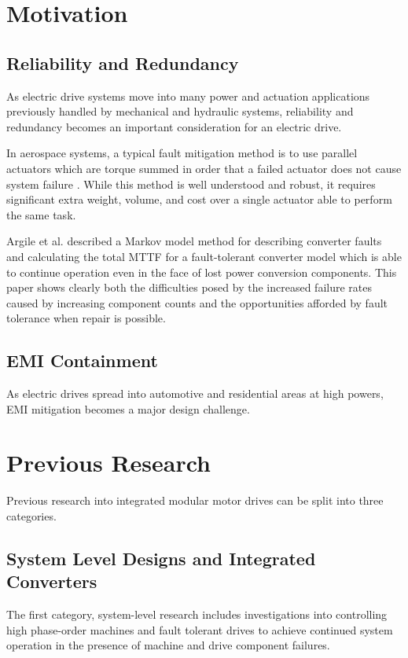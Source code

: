 \section{Motivation}



\subsection{Reliability and Redundancy}
As electric drive systems move into many power and actuation applications
previously handled by mechanical and hydraulic systems, reliability and
redundancy becomes an important consideration for an electric drive.

In aerospace systems, a typical fault mitigation method is to use parallel
actuators which are torque summed in order that a failed actuator does not
cause system failure \cite{Annaz09}.
While this method is well understood and robust, it requires significant extra
weight, volume, and cost over a single actuator able to perform the same task.

Argile et al. \cite{Argile08} described a Markov model method for describing
converter faults and calculating the total MTTF for a fault-tolerant converter
model which is able to continue operation even in the face of lost power
conversion components.
This paper shows clearly both the difficulties posed by the increased failure
rates caused by increasing component counts and the opportunities afforded by
fault tolerance when repair is possible.


\subsection{EMI Containment}
As electric drives spread into automotive and residential areas at high
powers, EMI mitigation becomes a major design challenge.



\section{Previous Research}
Previous research into integrated modular motor drives can be split into three
categories.
\subsection{System Level Designs and Integrated Converters}
The first category, system-level research includes investigations into
controlling high phase-order machines and fault tolerant drives to achieve
continued system operation in the presence of machine and drive component
failures.

